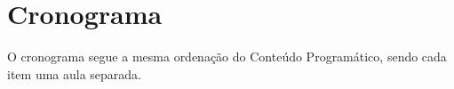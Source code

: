\documentclass{article}
\begin{document}
\section{Cronograma}

O cronograma segue a mesma ordenação do Conteúdo Programático, sendo cada item
uma aula separada.

\nocite{*}


\end{document}
